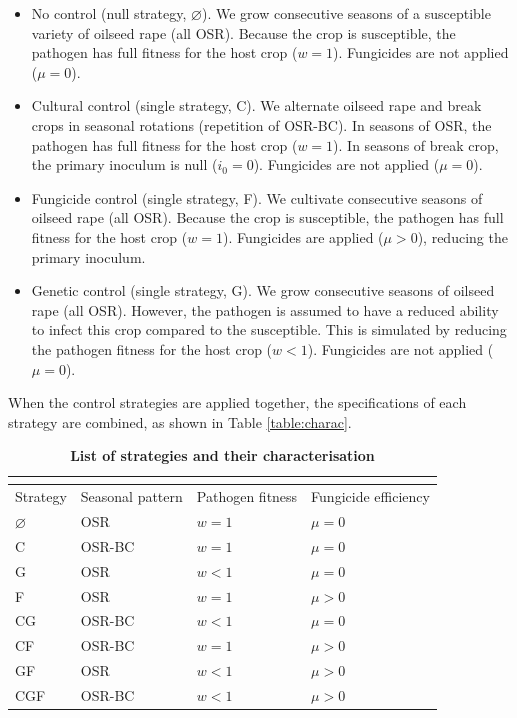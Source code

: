 \documentclass{article}
\begin{document}
\begin{itemize}
\item No control (null strategy, $\varnothing$). We grow consecutive seasons of a susceptible variety of oilseed rape (all OSR). Because the crop is susceptible, the pathogen has full fitness for the host crop ($w = 1$). Fungicides are not applied ($\mu = 0$). 

\item Cultural control (single strategy, C). We alternate oilseed rape and break crops in seasonal rotations (repetition of OSR-BC). In seasons of OSR, the pathogen has full fitness for the host crop ($w = 1$). In seasons of break crop, the primary inoculum is null ($i_0 = 0$). Fungicides are not applied ($\mu = 0$). 

\item Fungicide control (single strategy, F). We cultivate consecutive seasons of oilseed rape (all OSR). Because the crop is susceptible, the pathogen has full fitness for the host crop ($w = 1$). Fungicides are applied ($\mu > 0$), reducing the primary inoculum. 

\item Genetic control (single strategy, G). We grow consecutive seasons of oilseed rape (all OSR). However, the pathogen is assumed to have a reduced ability to infect this crop compared to the susceptible. This is simulated by reducing the pathogen fitness for the host crop ($w < 1$). Fungicides are not applied ($\mu = 0$). 
\end{itemize}

When the control strategies are applied together, the specifications of each strategy are combined, as shown in Table \ref{table:charac}.


\begin{table}[h]
\caption{\label{table:c}\textbf{List of strategies and their characterisation}}
\begin{tabular}{llll}%

	\multicolumn{4}{c}{}\\
	\hline
	Strategy & Seasonal pattern & Pathogen fitness & Fungicide efficiency \\
	\hline
	$\varnothing$ & OSR & $w = 1$ & $\mu = 0$ \\
	C & OSR-BC & $w = 1$ & $\mu = 0$ \\
	G & OSR & $w < 1$ & $\mu = 0$ \\
	F & OSR & $w = 1$ & $\mu > 0$ \\
	CG & OSR-BC & $w < 1$ & $\mu = 0$ \\
	CF & OSR-BC & $w = 1$ & $\mu > 0$ \\
	GF & OSR & $w < 1$ & $\mu > 0$ \\
	CGF & OSR-BC & $w < 1$ & $\mu > 0$ \\
	\hline
\end{tabular}
\end{table}
\end{document}
